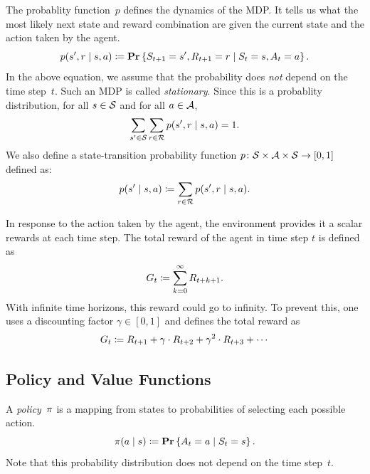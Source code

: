 The probablity function~$p$ defines the dynamics of the MDP. It tells us what 
the most likely next state and reward combination are given the current state 
and the action taken by the agent. 
\begin{equation}
    p(s', r \mid s, a) \coloneqq \mathbf{Pr} \left \{ S_{t + 1} = s', R_{t + 1} = r \mid S_t = s, A_t = a \right \}.
\end{equation} 
In the above equation, we assume that the probability does \emph{not} depend 
on the time step~$t$. Such an MDP is called \emph{stationary}. 
Since this is a probablity distribution, for all $s \in \mathcal{S}$ and for all 
$a \in \mathcal{A}$,
\begin{equation}
    \sum_{s' \in \mathcal{S}} \sum_{r \in \mathcal{R}} p(s', r \mid s, a) = 1.
\end{equation}
We also define a state-transition probability function 
$p \colon \mathcal{S} \times \mathcal{A} \times \mathcal{S} \rightarrow [0, 1]$ defined as:
\begin{equation}
    p(s' \mid s, a) \coloneqq \sum_{r \in \mathcal{R}}  p(s', r \mid s, a).
\end{equation}

In response to the action taken by the agent, the environment provides it a 
scalar rewards at each time step. The total reward of the agent in time step $t$ is
defined as
\begin{equation}
    G_t \coloneqq \sum_{k = 0}^{\infty} R_{t + k + 1}.
\end{equation}
With infinite time horizons, this reward could go to infinity. To prevent this,
one uses a discounting factor $\gamma \in [0, 1]$ and defines the total reward as
\begin{equation}
    G_t \coloneqq R_{t + 1} + \gamma \cdot R_{t + 2} + \gamma^2 \cdot R_{t + 3} + \cdots 
\end{equation}

\subsection{Policy and Value Functions}
A \emph{policy}~$\pi$ is a mapping from states to probabilities of selecting each possible 
action. 
\begin{equation}
    \pi (a \mid s) \coloneqq \mathbf{Pr} \left \{ A_t = a \mid S_t = s \right \}.
\end{equation}
Note that this probability distribution does not depend on the time step~$t$.

